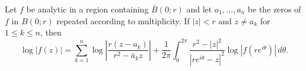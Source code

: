 Let $f$ be analytic in a region containing $\bar{B}(0; r)$ and let $a_1, \ldots, a_n$ be the zeros of $f$ in $B(0; r)$ repeated according to multiplicity. If $|z| < r$ and $z \neq a_k$ for $1 \leq k \leq n$, then
$$
\log |f(z)| = \sum_{k=1}^{n} \log \left| \frac{r(z-a_k)}{r^2 - \bar{a}_k z} \right| + \frac{1}{2\pi} \int_{0}^{2\pi} \frac{r^2 - |z|^2}{|re^{i\theta} - z|^2} \log |f(re^{i\theta})| \, d\theta.
$$
